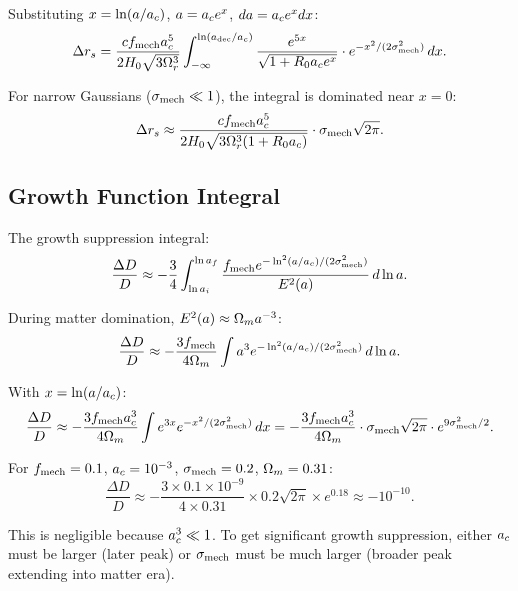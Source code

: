 Substituting $x = \ln(a/a_c)$, $a = a_c e^x$, $da = a_c e^x dx$:
\begin{equation}
\Delta r_s = \frac{c f_{\mathrm{mech}} a_c^5}{2H_0\sqrt{3\Omega_r^3}} \int_{-\infty}^{\ln(a_{\mathrm{dec}}/a_c)} \frac{e^{5x}}{\sqrt{1+R_0a_c e^x}} \cdot e^{-x^2/(2\sigma_{\mathrm{mech}}^2)} \, dx.
\end{equation}

For narrow Gaussians ($\sigma_{\mathrm{mech}} \ll 1$), the integral is dominated near $x = 0$:
\begin{equation}
\Delta r_s \approx \frac{c f_{\mathrm{mech}} a_c^5}{2H_0\sqrt{3\Omega_r^3(1+R_0a_c)}} \cdot \sigma_{\mathrm{mech}}\sqrt{2\pi}.
\end{equation}

\subsection{Growth Function Integral}

The growth suppression integral:
\begin{equation}
\frac{\Delta D}{D} \approx -\frac{3}{4}\int_{\ln a_i}^{\ln a_f} \frac{f_{\mathrm{mech}} e^{-\ln^2(a/a_c)/(2\sigma_{\mathrm{mech}}^2)}}{E^2(a)} \, d\ln a.
\end{equation}

During matter domination, $E^2(a) \approx \Omega_m a^{-3}$:
\begin{equation}
\frac{\Delta D}{D} \approx -\frac{3f_{\mathrm{mech}}}{4\Omega_m} \int a^3 e^{-\ln^2(a/a_c)/(2\sigma_{\mathrm{mech}}^2)} \, d\ln a.
\end{equation}

With $x = \ln(a/a_c)$:
\begin{equation}
\frac{\Delta D}{D} \approx -\frac{3f_{\mathrm{mech}} a_c^3}{4\Omega_m} \int e^{3x} e^{-x^2/(2\sigma_{\mathrm{mech}}^2)} \, dx = -\frac{3f_{\mathrm{mech}} a_c^3}{4\Omega_m} \cdot \sigma_{\mathrm{mech}}\sqrt{2\pi} \cdot e^{9\sigma_{\mathrm{mech}}^2/2}.
\end{equation}

For $f_{\mathrm{mech}} = 0.1$, $a_c = 10^{-3}$, $\sigma_{\mathrm{mech}} = 0.2$, $\Omega_m = 0.31$:
\begin{equation}
\frac{\Delta D}{D} \approx -\frac{3 \times 0.1 \times 10^{-9}}{4 \times 0.31} \times 0.2\sqrt{2\pi} \times e^{0.18} \approx -10^{-10}.
\end{equation}

This is negligible because $a_c^3 \ll 1$. To get significant growth suppression, either $a_c$ must be larger (later peak) or $\sigma_{\mathrm{mech}}$ must be much larger (broader peak extending into matter era).


